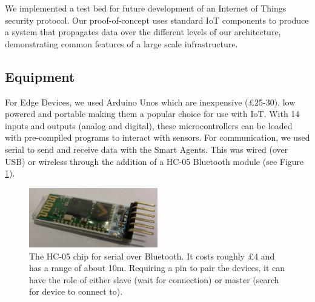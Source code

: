 

We implemented a test bed for future development of an Internet of Things security protocol. Our proof-of-concept uses standard IoT components to produce a system that propagates data over the different levels of our architecture, demonstrating common features of a large scale infrastructure.




\subsection{Equipment}

For Edge Devices, we used Arduino Unos which are inexpensive (£25-30), low powered and portable making them a popular choice for use with IoT. With 14 inputs and outputs (analog and digital), these microcontrollers can be loaded with pre-compiled programs to interact with sensors. For communication, we used serial to send and receive data with the Smart Agents. This was wired (over USB) or wireless through the addition of a HC-05 Bluetooth module (see Figure \ref{fig:HC-05}).


\begin{figure}
    \centering
    \includegraphics[width=0.5\textwidth]{HC05.jpg}
    \caption{The HC-05 chip for serial over Bluetooth. It costs roughly £4 and has a range of about 10m. Requiring a pin to pair the devices, it can have the role of either slave (wait for connection) or master (search for device to connect to).}
    \label{fig:HC-05}
\end{figure}


